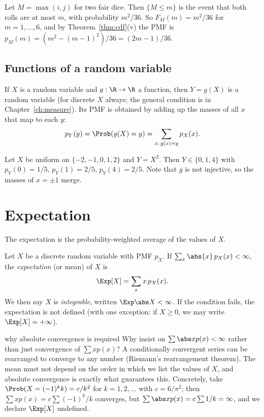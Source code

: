 \begin{example}\label{ex:maxdice}
Let $M=\max(i,j)$ for two fair dice. Then $\{M\le m\}$ is the event that both
rolls are at most $m$, with probability $m^2/36$. So $F_M(m)=m^2/36$ for
$m=1,\dots,6$, and by Theorem~\ref{thm:cdf}(v) the PMF is
$p_M(m)=(m^2-(m-1)^2)/36=(2m-1)/36$.
\end{example}

\subsection*{Functions of a random variable}

If $X$ is a random variable and $g:\R\to\R$ a function, then $Y=g(X)$ is a random
variable (for discrete $X$ always; the general condition is in
Chapter~\ref{ch:measure}). Its PMF is obtained by adding up the masses of all
$x$ that map to each $y$:
\[
p_Y(y)=\Prob(g(X)=y)=\sum_{x:\,g(x)=y}p_X(x).
\]

\begin{example}
Let $X$ be uniform on $\{-2,-1,0,1,2\}$ and $Y=X^2$. Then $Y\in\{0,1,4\}$ with
$p_Y(0)=1/5$, $p_Y(1)=2/5$, $p_Y(4)=2/5$. Note that $g$ is not injective, so the
masses of $x=\pm1$ merge.
\end{example}

\section{Expectation}

The expectation is the probability-weighted average of the values of $X$.

\begin{definition}[Expectation]
Let $X$ be a discrete random variable with PMF $p_X$. If
$\sum_x\abs{x}\,p_X(x)<\infty$, the \emph{expectation} (or mean) of $X$ is
\[
\Exp[X]=\sum_xx\,p_X(x).
\]
We then say $X$ is \emph{integrable}, written $\Exp\abs X<\infty$. If the
condition fails, the expectation is not defined (with one exception: if
$X\ge0$, we may write $\Exp[X]=+\infty$).
\end{definition}

\begin{nuance}{why absolute convergence is required}
Why insist on $\sum\abs x p(x)<\infty$ rather than just convergence of
$\sum xp(x)$? A conditionally convergent series can be rearranged to converge to
any number (Riemann's rearrangement theorem). The mean must not depend on the
order in which we list the values of $X$, and absolute convergence is exactly
what guarantees this. Concretely, take $\Prob(X=(-1)^{k}k)=c/k^2$ for
$k=1,2,\dots$ with $c=6/\pi^2$; then $\sum xp(x)=c\sum(-1)^k/k$ converges, but
$\sum\abs xp(x)=c\sum1/k=\infty$, and we declare $\Exp[X]$ undefined.
\end{nuance}


